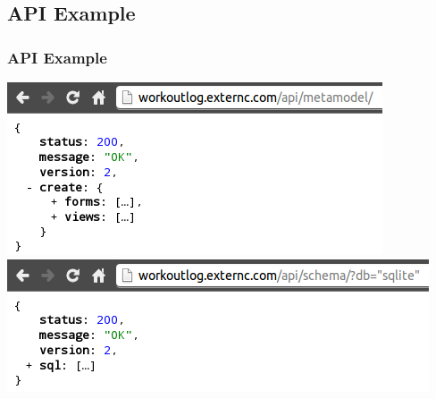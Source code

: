 \documentclass[]{beamer}
\begin{document}
\subsection{API Example}
\begin{frame}
\frametitle{API Example}

\includegraphics[width=.9\linewidth]{images/metamodel.png} \\
\includegraphics[width=.9\linewidth]{images/schema.png}
\end{frame}


\end{document}
